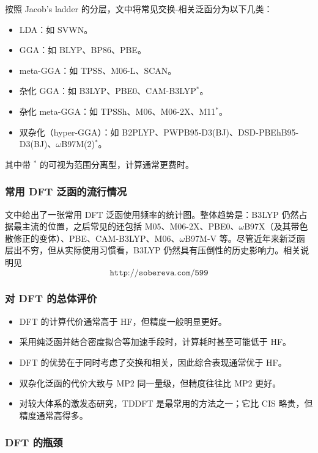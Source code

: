 按照 Jacob's ladder 的分层，文中将常见交换-相关泛函分为以下几类：
\begin{itemize}
  \item LDA：如 SVWN。
  \item GGA：如 BLYP、BP86、PBE。
  \item meta-GGA：如 TPSS、M06-L、SCAN。
  \item 杂化 GGA：如 B3LYP、PBE0、CAM-B3LYP$^\ast$。
  \item 杂化 meta-GGA：如 TPSSh、M06、M06-2X、M11$^\ast$。
  \item 双杂化（hyper-GGA）：如 B2PLYP、PWPB95-D3(BJ)、DSD-PBEhB95-D3(BJ)、$\omega$B97M(2)$^\ast$。
\end{itemize}

\noindent 其中带 $^\ast$ 的可视为范围分离型，计算通常更费时。

\subsubsection*{常用 DFT 泛函的流行情况}

文中给出了一张常用 DFT 泛函使用频率的统计图。整体趋势是：B3LYP 仍然占据最主流的位置，之后常见的还包括 M05、M06-2X、PBE0、$\omega$B97X（及其带色散修正的变体）、PBE、CAM-B3LYP、M06、$\omega$B97M-V 等。尽管近年来新泛函层出不穷，但从实际使用习惯看，B3LYP 仍然具有压倒性的历史影响力。相关说明见
\[
\texttt{http://sobereva.com/599}
\]

\subsubsection*{对 DFT 的总体评价}

\begin{itemize}
  \item DFT 的计算代价通常高于 HF，但精度一般明显更好。
  \item 采用纯泛函并结合密度拟合等加速手段时，计算耗时甚至可能低于 HF。
  \item DFT 的优势在于同时考虑了交换和相关，因此综合表现通常优于 HF。
  \item 双杂化泛函的代价大致与 MP2 同一量级，但精度往往比 MP2 更好。
  \item 对较大体系的激发态研究，TDDFT 是最常用的方法之一；它比 CIS 略贵，但精度通常高得多。
\end{itemize}

\subsubsection*{DFT 的瓶颈}

